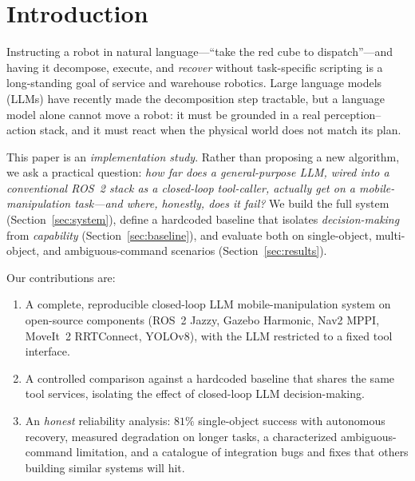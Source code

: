 \documentclass[conference]{IEEEtran}
\begin{document}
\section{Introduction}
Instructing a robot in natural language---``take the red cube to
dispatch''---and having it decompose, execute, and \emph{recover} without
task-specific scripting is a long-standing goal of service and warehouse
robotics. Large language models (LLMs) have recently made the decomposition step
tractable, but a language model alone cannot move a robot: it must be grounded in
a real perception--action stack, and it must react when the physical world does
not match its plan.

This paper is an \emph{implementation study}. Rather than proposing a new
algorithm, we ask a practical question: \emph{how far does a general-purpose LLM,
wired into a conventional ROS~2 stack as a closed-loop tool-caller, actually get
on a mobile-manipulation task---and where, honestly, does it fail?} We build the
full system (Section~\ref{sec:system}), define a hardcoded baseline that isolates
\emph{decision-making} from \emph{capability} (Section~\ref{sec:baseline}), and
evaluate both on single-object, multi-object, and ambiguous-command scenarios
(Section~\ref{sec:results}).

Our contributions are:
\begin{enumerate}
\item A complete, reproducible closed-loop LLM mobile-manipulation system on
open-source components (ROS~2 Jazzy, Gazebo Harmonic, Nav2 MPPI, MoveIt~2
RRTConnect, YOLOv8), with the LLM restricted to a fixed tool interface.
\item A controlled comparison against a hardcoded baseline that shares the same
tool services, isolating the effect of closed-loop LLM decision-making.
\item An \emph{honest} reliability analysis: $81\%$ single-object success with
autonomous recovery, measured degradation on longer tasks, a characterized
ambiguous-command limitation, and a catalogue of integration bugs and fixes that
others building similar systems will hit.
\end{enumerate}

\end{document}
